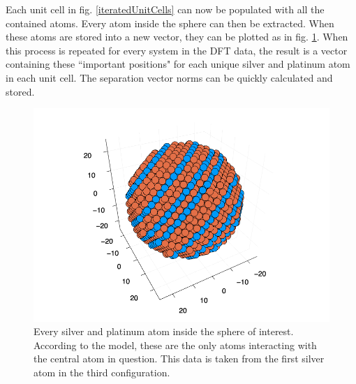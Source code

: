 Each unit cell in fig. \ref{iteratedUnitCells} can now be populated with all the contained atoms. Every atom inside the sphere can then be extracted. When these atoms are stored into a new vector, they can be plotted as in fig. \ref{plotAgAtomSphere}. When this process is repeated for every system in the DFT data, the result is a vector containing these ``important positions" for each unique silver and platinum atom in each unit cell. The separation vector norms can be quickly calculated and stored.

\begin{figure}%
\centering
\includegraphics[scale = 0.65]{Figures/plotAgAtomSphere(3,1)}
\caption{Every silver and platinum atom inside the sphere of interest. According to the model, these are the only atoms interacting with the central atom in question. This data is taken from the first silver atom in the third configuration. 
\label{plotAgAtomSphere}} 
\end{figure}

